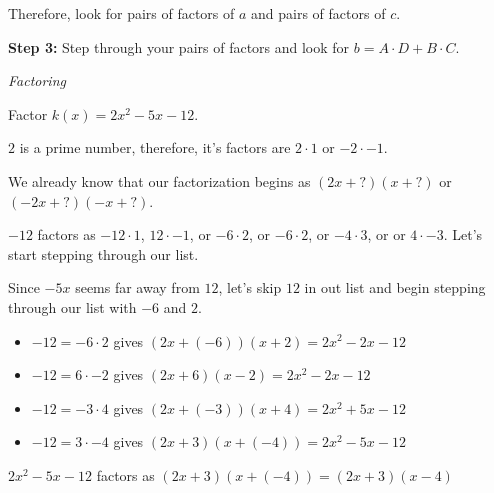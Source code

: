 \documentclass{ximera}
\begin{document}
Therefore, look for pairs of factors of $a$ and pairs of factors of $c$.






\textbf{Step 3:} Step through your pairs of factors and look for $b = A\cdot D + B \cdot C$.










\begin{example} \textit{Factoring}

Factor $k(x) = 2 x^2 - 5 x - 12$.


$2$ is a prime number, therefore, it's factors are $2 \cdot 1$ or $-2 \cdot -1$.

We already know that our factorization begins as $(2 x + ?) (x + ?)$ or $(-2 x + ?) (-x + ?)$.

$-12$ factors as $-12 \cdot 1$, $12 \cdot -1$, or $-6 \cdot 2$, or  $-6 \cdot 2$, or $-4 \cdot 3$, or or $4 \cdot -3$.  Let's start stepping through our list.

Since $-5 x$ seems far away from $12$, let's skip $12$ in out list and begin stepping through our list with $-6$ and $2$.

\begin{itemize}

\item $-12 = -6 \cdot 2$ gives $(2 x + (-6)) (x + 2) = 2 x^2 - 2 x - 12$
\item $-12 = 6 \cdot -2$ gives $(2 x + 6) (x - 2) = 2 x^2 - 2 x -12$
\item $-12 = -3 \cdot 4$ gives $(2 x + (-3)) (x + 4) = 2 x^2 + 5 x - 12$
\item $-12 = 3 \cdot -4$ gives $(2 x + 3) (x + (-4)) = 2 x^2 - 5 x -12$
\end{itemize}

$2 x^2 - 5 x - 12$ factors as $(2 x + 3) (x + (-4)) = (2 x + 3)(x - 4)$

\end{example}
\end{document}
